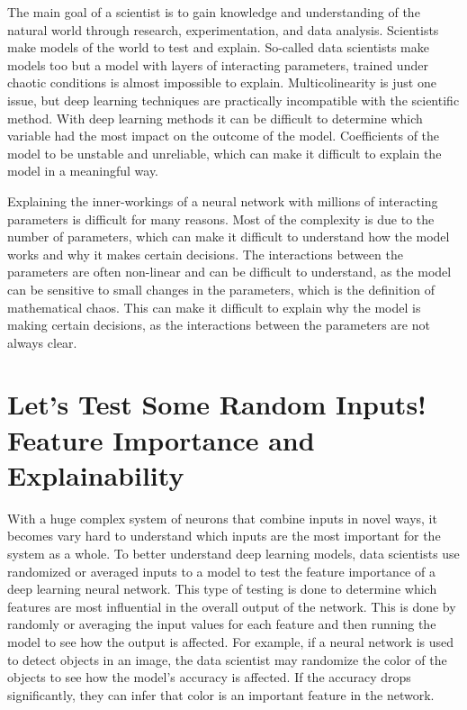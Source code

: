 The main goal of a scientist is to gain knowledge and understanding of the natural world through research, experimentation, and data analysis. Scientists make models of the world to test and explain. So-called data scientists make models too but a model with layers of interacting parameters, trained under chaotic conditions is almost impossible to explain. Multicolinearity is just one issue, but deep learning techniques are practically incompatible with the scientific method. With deep learning methods it can be difficult to determine which variable had the most impact on the outcome of the model. Coefficients of the model to be unstable and unreliable, which can make it difficult to explain the model in a meaningful way. 

Explaining the inner-workings of a neural network with millions of interacting parameters is difficult for many reasons. Most of the complexity is due to the number of parameters, which can make it difficult to understand how the model works and why it makes certain decisions. The interactions between the parameters are often non-linear and can be difficult to understand, as the model can be sensitive to small changes in the parameters, which is the definition of mathematical chaos. This can make it difficult to explain why the model is making certain decisions, as the interactions between the parameters are not always clear.

\section{Let's Test Some Random Inputs! Feature Importance and Explainability}

With a huge complex system of neurons that combine inputs in novel ways, it becomes vary hard to understand which inputs are the most important for the system as a whole. To better understand deep learning models, data scientists use randomized or averaged inputs to a model to test the feature importance of a deep learning neural network. This type of testing is done to determine which features are most influential in the overall output of the network. This is done by randomly or averaging the input values for each feature and then running the model to see how the output is affected. For example, if a neural network is used to detect objects in an image, the data scientist may randomize the color of the objects to see how the model’s accuracy is affected. If the accuracy drops significantly, they can infer that color is an important feature in the network.

